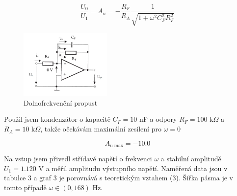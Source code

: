 \documentclass[a4paper,11pt]{article}
\begin{document}
\begin{equation}
\frac{U_0}{U_1} = A_u = -\frac{R_F}{R_A} \frac{1}{ \sqrt{1 + \omega^2 C_F^2 R_F^2} } 
\end{equation}

\begin{figure}[h]
    \centering
    \includegraphics[width=0.4\textwidth]{propust.jpg}
    \caption{Dolnofrekvenční propust}
\end{figure}

Použil jsem kondenzátor o kapacitě $ C_F = 10  $ nF a odpory $ R_F = 100 $ k$\Omega$ a $ R_A = 10 $ k$ \Omega $, takže očekávám maximální zesílení pro $ \omega = 0 $ 

\begin{equation}
A_{\text{u max}} = - 10.0
\end{equation}


Na vstup jsem přivedl střídavé napětí o frekvenci $ \omega $ a stabilní amplitudě $ U_1 = 1.120 $ V a měřil amplitudu výstupního napětí. Naměřená data jsou v tabulce 3 a graf 3 je porovnává s teoretickým vztahem (3). Šířka pásma je v tomto případě $ \omega \in (0, 168) $ Hz.
\end{document}
